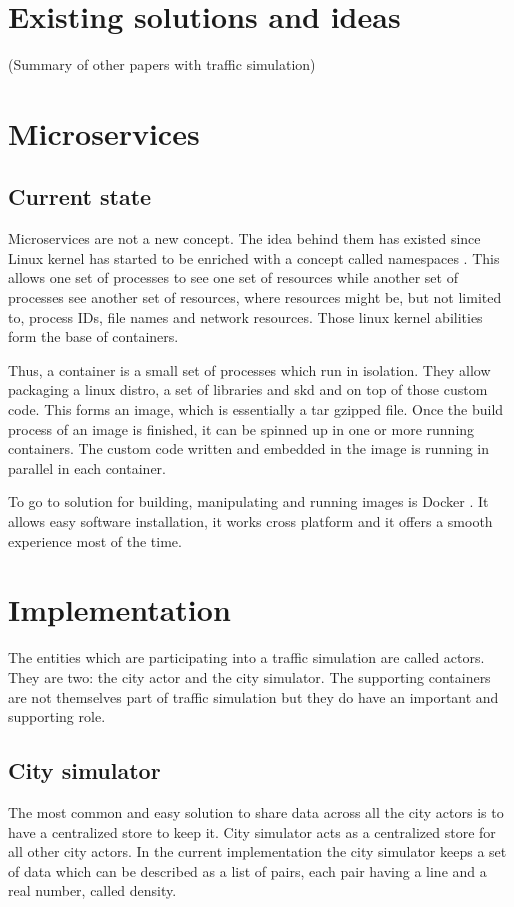 \documentclass[conference]{IEEEtran}
\begin{document}
\section{Existing solutions and ideas}
(Summary of other papers with traffic simulation)

\section{Microservices}

\subsection{Current state}
Microservices are not a new concept. The idea behind them has existed since Linux kernel has started to be enriched with a concept called namespaces \cite{wiki:linuxns}. This allows one set of processes to see one set of resources while another set of processes see another set of resources, where resources might be, but not limited to, process IDs, file names and network resources. Those linux kernel abilities form the base of containers.

Thus, a container is a small set of processes which run in isolation. They allow packaging a linux distro, a set of libraries and skd and on top of those custom code. This forms an image, which is essentially a tar gzipped file. Once the build process of an image is finished, it can be spinned up in one or more running containers. The custom code written and embedded in the image is running in parallel in each container.

To go to solution for building, manipulating and running images is Docker \cite{docker}. It allows easy software installation, it works cross platform and it offers a smooth experience most of the time.

\section{Implementation}

The entities which are participating into a traffic simulation are called actors. They are two: the city actor and the city simulator. The supporting containers are not themselves part of traffic simulation but they do have an important and supporting role.

\subsection{City simulator}
The most common and easy solution to share data across all the city actors is to have a centralized store to keep it. City simulator acts as a centralized store for all other city actors. In the current implementation the city simulator keeps a set of data which can be described as a list of pairs, each pair having a line and a real number, called density.
\end{document}
